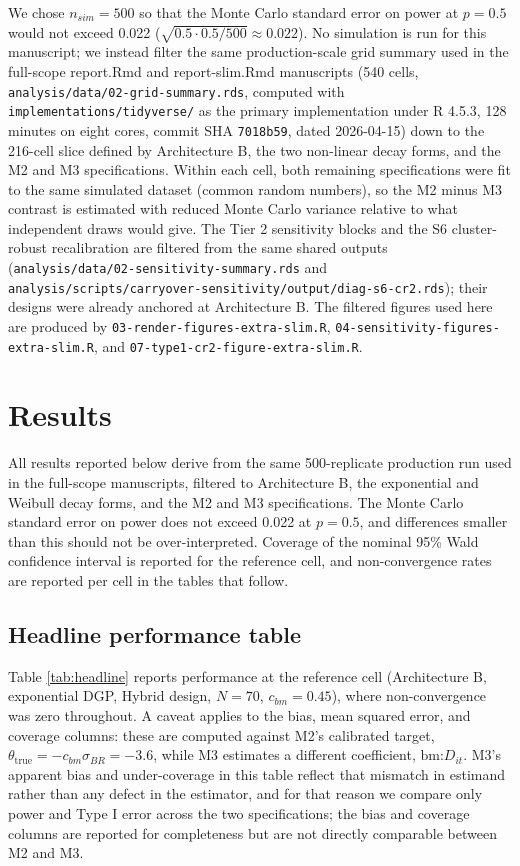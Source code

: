 \documentclass[
  11pt,
]{article}
\begin{document}
We chose \(n_{sim} = 500\) so that the Monte Carlo standard error on
power at \(p = 0.5\) would not exceed 0.022
(\(\sqrt{0.5 \cdot 0.5 / 500} \approx 0.022\)). No simulation is run
for this manuscript; we instead filter the same production-scale
grid summary used in the full-scope report.Rmd and report-slim.Rmd
manuscripts (540 cells, \texttt{analysis/data/02-grid-summary.rds},
computed with \texttt{implementations/tidyverse/} as the primary
implementation under R 4.5.3, 128 minutes on eight cores, commit SHA
\texttt{7018b59}, dated 2026-04-15) down to the 216-cell slice defined by
Architecture B, the two non-linear decay forms, and the M2 and M3
specifications. Within each cell, both remaining specifications were
fit to the same simulated dataset (common random numbers), so the
M2 minus M3 contrast is estimated with reduced Monte Carlo variance
relative to what independent draws would give. The Tier 2
sensitivity blocks and the S6 cluster-robust recalibration are
filtered from the same shared outputs
(\texttt{analysis/data/02-sensitivity-summary.rds} and
\texttt{analysis/scripts/carryover-sensitivity/output/diag-s6-cr2.rds});
their designs were already anchored at Architecture B. The filtered
figures used here are produced by \texttt{03-render-figures-extra-slim.R},
\texttt{04-sensitivity-figures-extra-slim.R}, and
\texttt{07-type1-cr2-figure-extra-slim.R}.

\section{Results}\label{results}

All results reported below derive from the same 500-replicate
production run used in the full-scope manuscripts, filtered to
Architecture B, the exponential and Weibull decay forms, and the M2
and M3 specifications. The Monte Carlo standard error on power does
not exceed 0.022 at \(p = 0.5\), and differences smaller than this
should not be over-interpreted. Coverage of the nominal 95\% Wald
confidence interval is reported for the reference cell, and
non-convergence rates are reported per cell in the tables that
follow.

\subsection{Headline performance table}\label{sec-headline}

Table \ref{tab:headline} reports performance at the reference cell
(Architecture B, exponential DGP, Hybrid design, \(N = 70\),
\(c_{bm} = 0.45\)), where non-convergence was zero throughout. A
caveat applies to the bias, mean squared error, and coverage
columns: these are computed against M2's calibrated target,
\(\theta_{\text{true}} = -c_{bm}\sigma_{BR} = -3.6\), while M3
estimates a different coefficient, \(\text{bm:}D_{it}\). M3's apparent
bias and under-coverage in this table reflect that mismatch in
estimand rather than any defect in the estimator, and for that
reason we compare only power and Type I error across the two
specifications; the bias and coverage columns are reported for
completeness but are not directly comparable between M2 and M3.
\end{document}
